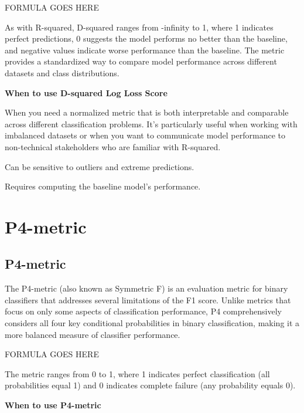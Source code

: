 % 
FORMULA GOES HERE
% 

As with R-squared, D-squared ranges from -infinity to 1, where 1 indicates perfect predictions, 0 suggests the model performs no better than the baseline, and negative values indicate
worse performance than the baseline. The metric provides a standardized way to compare model performance across different datasets and class distributions.

\textbf{When to use D-squared Log Loss Score}

When you need a normalized metric that is both interpretable and comparable across different classification problems. It's particularly useful when working with imbalanced
datasets or when you want to communicate model performance to non-technical stakeholders who are familiar with R-squared.

{
    \item Can be sensitive to outliers and extreme predictions.
    \item Requires computing the baseline model's performance.
}


\clearpage
\thispagestyle{classificationstyle}
\section{P4-metric}
\subsection{P4-metric}

The P4-metric (also known as Symmetric F) is an evaluation metric for binary classifiers that addresses several limitations of the F1 score. Unlike metrics that focus
on only some aspects of classification performance, P4 comprehensively considers all four key conditional probabilities in binary classification, making it a
more balanced measure of classifier performance.

% 
FORMULA GOES HERE
% 

The metric ranges from 0 to 1, where 1 indicates perfect classification (all probabilities equal 1) and 0 indicates complete failure (any probability equals 0).

\textbf{When to use P4-metric}

